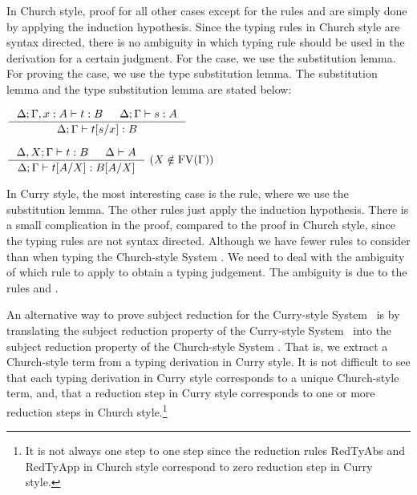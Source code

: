 In Church style, proof for all other cases except for the rules
 and  are simply done by applying
the induction hypothesis. Since the typing rules in Church style are
syntax directed, there is no ambiguity in which typing rule should be used
in the derivation for a certain judgment. For the  case,
we use the substitution lemma. For proving the  case,
we use the type substitution lemma. The substitution lemma and
the type substitution lemma are stated below:
\begin{lemma}[substitution]
$ \inference{\Delta;\Gamma,x:A |- t : B  & \Delta;\Gamma |- s : A}
        {\Delta;\Gamma |- t[s/x] : B} $
\end{lemma}
\begin{lemma}
$ \inference{\Delta,X;\Gamma |- t : B  & \Delta |- A}
        {\Delta;\Gamma |- t[A/X] : B[A/X]} ~ (X\notin\FV(\Gamma))$
\end{lemma}

In Curry style, the most interesting case is the  rule,
where we use the substitution lemma. The other rules just apply the
induction hypothesis. There is a small complication
in the proof, compared to the proof in Church style, since the typing rules
are not syntax directed. Although we have fewer rules to consider than when
typing the Church-style System \F. We need to deal with the ambiguity of which rule
to apply to obtain a typing judgement. The ambiguity is due to the rules
 and .

An alternative way to prove subject reduction for the Curry-style System \F\ is
by translating the subject reduction property of the Curry-style System \F\ into
the subject reduction property of the Church-style System \F. That is, we extract
a Church-style term from a typing derivation in Curry style. It is not
difficult to see that each typing derivation in Curry style corresponds to
a unique Church-style term, and, that a reduction step in Curry style
corresponds to one or more reduction steps in Church style.\footnote{
It is not always one step to one step since the reduction rules
{\sc RedTyAbs} and {\sc RedTyApp} in Church style correspond to
zero reduction step in Curry style.}

